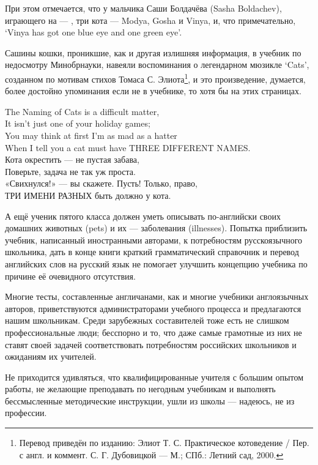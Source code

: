 При этом отмечается, что у мальчика Саши Болдачёва (Sasha Boldachev), играющего на ---  , три кота --- Modya, Gosha и Vinya, и, что примечательно, `Vinya has got one blue eye and one green eye'.

Сашины кошки, проникшие, как и другая излишняя информация, в учебник по недосмотру Минобрнауки, навеяли воспоминания о легендарном мюзикле ‘Cats’, созданном по мотивам стихов Томаса С. Элиота\footnote{Перевод приведён по изданию: Элиот Т. С. Практическое котоведение / Пер. с англ. и коммент. С. Г. Дубовицкой --- М.; СПб.: Летний сад, 2000.}, и это произведение, думается, более достойно упоминания если не в учебнике, то хотя бы на этих страницах.

\begin{center}
    The Naming of Cats is a difficult matter,\\
    It isn't just one of your holiday games;\\
    You may think at first I'm as mad as a hatter\\
    When I tell you a cat must have THREE DIFFERENT NAMES.\\[1em]

    Кота окрестить --- не пустая забава,\\
    Поверьте, задача не так уж проста.\\
    «Свихнулся!» --- вы скажете.
    Пусть! Только, право,\\
    ТРИ ИМЕНИ РАЗНЫХ быть должно у кота.
\end{center}

А ещё ученик пятого класса должен уметь описывать по-английски своих домашних животных (pets) и их ---  заболевания (illnesses). Попытка приблизить учебник, написанный иностранными авторами, к потребностям русскоязычного школьника, дать в конце книги краткий грамматический справочник и перевод английских слов на русский язык не помогает улучшить концепцию учебника по причине её очевидного отсутствия.

Многие тесты, составленные англичанами, как и многие учебники англоязычных авторов, приветствуются администраторами учебного процесса и предлагаются нашим школьникам. Среди зарубежных составителей тоже есть не слишком профессиональные люди; бесспорно и то, что даже самые грамотные из них не ставят своей задачей соответствовать потребностям российских школьников и ожиданиям их учителей.


Не приходится удивляться, что квалифицированные учителя с большим опытом работы, не желающие преподавать по негодным учебникам и выполнять бессмысленные методические инструкции, ушли из школы --- надеюсь, не из профессии.

